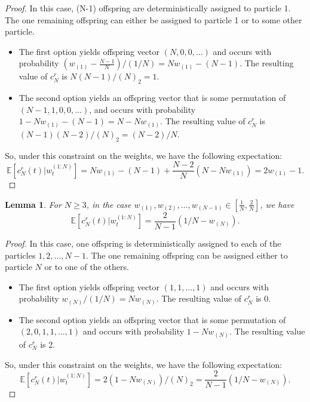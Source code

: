 \documentclass[fleqn]{article}
\newtheorem{lemma}{Lemma}
\theoremstyle{definition}
\newcommand{\E}{\mathbb{E}}
\newcommand{\wt}[2][t]{w_{#1}^{(#2)}}
\begin{document}
\begin{proof}
In this case, (N-1) offspring are deterministically assigned to particle 1. The one remaining offspring can either be assigned to particle 1 or to some other particle.
\begin{itemize}
\item The first option yields offspring vector $(N, 0, 0, \dots)$ and occurs with probability $(w_{(1)} - \frac{N-1}{N})/(1/N) = Nw_{(1)} - (N-1)$. The resulting value of $c_N^r$ is $N(N-1)/(N)_2 = 1$.
\item The second option yields an offspring vector that is some permutation of $(N-1, 1, 0, 0, \dots)$, and occurs with probability $1- Nw_{(1)} - (N-1) = N - Nw_{(1)}$. The resulting value of $c_N^r$ is $(N-1)(N-2)/(N)_2 = (N-2)/N$.
\end{itemize}
So, under this constraint on the weights, we have the following expectation:
\begin{equation*}
\E[c_N^r(t) |\wt{1:N}] = Nw_{(1)} - (N-1) + \frac{N-2}{N}(N - Nw_{(1)}) = 2w_{(1)} -1.
\end{equation*} 
\end{proof}

\begin{lemma}
For $N\geq 3$, in the case $w_{(1)}, w_{(2)}, \dots, w_{(N-1)} \in \left[\frac{1}{N}, \frac{2}{N}\right]$, we have
\begin{equation*}
\E[c_N^r(t) |\wt{1:N}] = \frac{2}{N-1}(1/N - w_{(N)}).
\end{equation*}
\end{lemma}

\begin{proof}
In this case, one offspring is deterministically assigned to each of the particles $1,2,\dots,N-1$. The one remaining offspring can be assigned either to particle $N$ or to one of the others.
\begin{itemize}
\item The first option yields offspring vector $(1,1,\dots, 1)$ and occurs with probability $w_{(N)}/(1/N) = Nw_{(N)}$. The resulting value of $c_N^r$ is 0.
\item The second option yields an offspring vector that is some permutation of $(2,0,1,1,\dots,1)$ and occurs with probability $1- Nw_{(N)}$. The resulting value of $c_N^r$ is 2.
\end{itemize}
So, under this constraint on the weights, we have the following expectation:
\begin{equation*}
\E[c_N^r(t) |\wt{1:N}] = 2(1- Nw_{(N)})/(N)_2 =  \frac{2}{N-1}(1/N - w_{(N)}).
\end{equation*} 
\end{proof}
\end{document}

